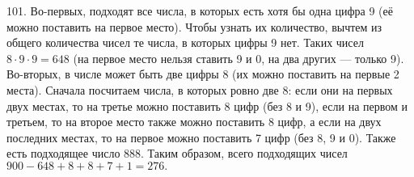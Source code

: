 101. Во-первых, подходят все числа, в которых есть хотя бы одна цифра 9 (её можно поставить на первое место). Чтобы узнать их количество, вычтем из общего количества чисел те числа, в которых цифры 9 нет. Таких чисел $8\cdot9\cdot9=648$ (на первое место нельзя ставить 9 и 0, на два других --- только 9). Во-вторых, в числе может быть две цифры 8 (их можно поставить на первые 2 места). Сначала посчитаем числа, в которых ровно две 8: если они на первых двух местах, то на третье можно поставить 8 цифр (без 8 и 9), если на первом и третьем, то на второе место также можно поставить 8 цифр, а если на двух последних местах, то на первое можно поставить 7 цифр (без 8, 9 и 0). Также есть подходящее число 888.
Таким образом, всего подходящих чисел $900-648+8+8+7+1=276.$\\
